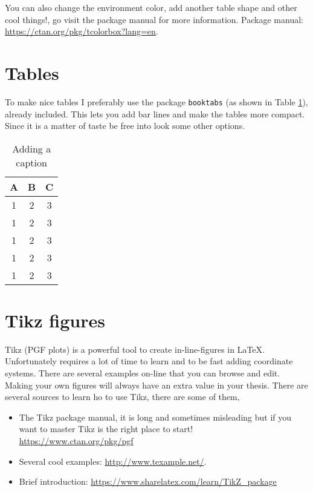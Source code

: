 \documentclass[../main/thesis_msc.tex]{subfiles}
\begin{document}
    \begin{note}
        You can also change the environment color, add another table shape and other cool things!, go visit the package manual for more information.
        Package manual: \url{https://ctan.org/pkg/tcolorbox?lang=en}.
    \end{note}

    \section{Tables}
    To make nice tables I preferably use the package \texttt{booktabs} (as shown in Table \ref{tab:my_table}), already included. This lets you add bar lines and make the tables more compact. Since it is a matter of taste be free into look some other options.

    \begin{table}[t]
        \centering
        \begin{tabular}{ccc}
            \toprule
            \textbf{A} & \textbf{B} & \textbf{C} \\ \midrule
            1 & 2 & 3 \\
            1 & 2 & 3 \\
            1 & 2 & 3 \\
            1 & 2 & 3 \\
            1 & 2 & 3 \\
            \bottomrule
        \end{tabular}
        \caption{Adding a caption}
        \label{tab:my_table}
    \end{table}

    \section{Tikz figures}
    Tikz (PGF plots) is a powerful tool to create in-line-figures in \LaTeX. Unfortunately requires a lot of time to learn and to be fast adding coordinate systems. There are several examples on-line that you can browse and edit. Making your own figures will always have an extra value in your thesis. There are several sources to learn ho to use Tikz, there are some of them,

    \begin{itemize}
        \item The Tikz package manual, it is long and sometimes misleading but if you want to master Tikz is the right place to start!
        \url{https://www.ctan.org/pkg/pgf}
        \item Several cool examples: \url{http://www.texample.net/}.
        \item Brief introduction: \url{https://www.sharelatex.com/learn/TikZ_package}
    \end{itemize}
\end{document}
